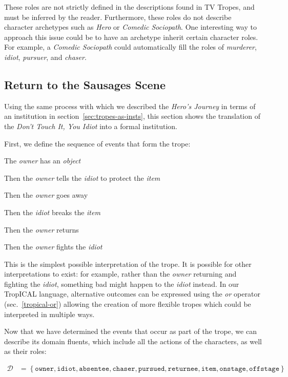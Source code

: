 These roles are not strictly defined in the descriptions found in TV Tropes, and
must be inferred by the reader. Furthermore, these roles do not describe
character archetypes such as \emph{Hero} or \emph{Comedic Sociopath}. One
interesting way to approach this issue could be to have an archetype inherit certain
character roles. For example, a \emph{Comedic Sociopath} could automatically
fill the roles of \emph{murderer}, \emph{idiot}, \emph{pursuer}, and
\emph{chaser}.

\subsection{Return to the Sausages Scene}

Using the same process with which we described the \emph{Hero's Journey} in
terms of an institution in section~\ref{sec:tropes-as-insts}, this section shows
the translation of the \emph{Don't Touch It, You Idiot} into a formal institution.

First, we define the sequence of events that form the trope:

\begin{compactitem}
\item The \emph{owner} has an \emph{object}
\item Then the \emph{owner} tells the \emph{idiot} to protect the \emph{item}
\item Then the \emph{owner} goes away
\item Then the \emph{idiot} breaks the \emph{item}
\item Then the \emph{owner} returns
\item Then the \emph{owner} fights the \emph{idiot}
\end{compactitem}

This is the simplest possible interpretation of the trope. It is possible for
other interpretations to exist: for example, rather than the \emph{owner} returning and
fighting the \emph{idiot}, something bad might happen to the \emph{idiot}
instead. In our TropICAL language, alternative outcomes can be expressed using
the \emph{or} operator (sec.~\ref{tropical-or}) allowing the creation of more flexible tropes
which could be interpreted in multiple ways.

Now that we have determined the events that occur as part of the trope, we can describe its domain fluents, which include all the
actions of the characters, as well as their roles:

\begin{align*}
   \mathcal{D} &= \left\{\mathtt{owner, idiot, absentee, chaser, pursued, returnee, item, onstage, offstage}\right\} %
\end{align*}

